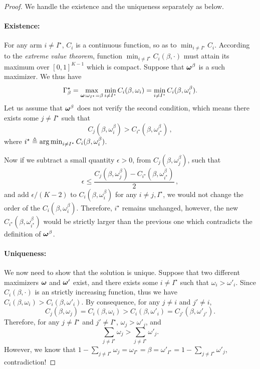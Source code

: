 \begin{proof}
We handle the existence and the uniqueness separately as below.

\paragraph{Existence:} For any arm $i\neq I^\star$, $C_i$ is a continuous function, so as to $\min_{i\neq I^\star} C_i$. According to the \emph{extreme value theorem}, function $\min_{i\neq I^\star} C_i(\beta,\cdot)$ must attain its maximum over $[0,1]^{K-1}$ which is compact. Suppose that ${\boldsymbol \omega}^\beta$ is a such maximizer. We thus have
\[
    \Gamma_{\beta}^\star = \max_{{\boldsymbol \omega}:\omega_{I^\star}=\beta}\min_{i\neq I^\star} C_i(\beta,\omega_i) = \min_{i\neq I^\star} C_i(\beta,\omega_i^\beta).
\]
Let us assume that ${\boldsymbol \omega}^\beta$ does not verify the second condition, which means there exists some $j\neq I^\star$ such that
\[
    C_j(\beta,\omega_i^\beta) > C_{i^\star}(\beta,\omega_{i^\star}^\beta)\,,
\]
where $i^\star \triangleq \operatorname*{arg\,min}_{i\neq I^\star} C_i(\beta,\omega_i^\beta)$.

Now if we subtract a small quantity $\epsilon>0$, from $C_j(\beta,\omega_j^\beta)$, such that
\[
    \epsilon \leq \frac{C_j(\beta,\omega_j^\beta)-C_{i^\star}(\beta,\omega_{i^\star}^\beta)}{2}\,,
\]
and add $\epsilon/(K-2)$ to $C_i(\beta,\omega_i^\beta)$ for any $i\neq j,I^\star$, we would not change the order of the $C_i(\beta,\omega_i^\beta)$. Therefore, $i^\star$ remains unchanged, however, the new $C_{i^\star}(\beta,\omega_{i^\star}^\beta)$ would be strictly larger than the previous one which contradicts the definition of ${\boldsymbol \omega}^\beta$.

\paragraph{Uniqueness:} 
We now need to show that the solution is unique. Suppose that two different maximizers ${\boldsymbol \omega}$ and ${\boldsymbol \omega}'$ exist, and there exists some $i\neq I^\star$ such that $\omega_i > \omega'_i$. Since $C_i(\beta,\cdot)$ is an strictly increasing function, thus we have $C_i(\beta,\omega_i)>C_i(\beta,\omega'_i)$. By consequence, for any $j\neq i$ and $j'\neq i$,
    \[
        C_j(\beta,\omega_j) = C_i(\beta,\omega_i) > C_i(\beta,\omega'_i) = C_{j'}(\beta,\omega'_{j'}).
    \]
Therefore, for any $j\neq I^\star$ and $j'\neq I^\star$, $\omega_j > \omega'_j$, and
    \[
        \sum_{j\neq I^\star} \omega_j > \sum_{j\neq I^\star} \omega'_j.
    \]
However, we know that $1-\sum_{j\neq I^\star} \omega_j = \omega_{I^\star} =  \beta = \omega'_{I^\star} = 1-\sum_{j\neq I^\star} \omega'_j$, contradiction!

\end{proof}

